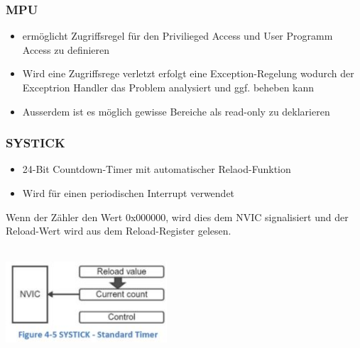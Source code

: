 \begin{multicols}{2}
\begin{minipage}{\linewidth}
        \subsubsection{MPU}
        \begin{itemize}
            \item ermöglicht Zugriffsregel für den Privilieged Access und User Programm Access zu definieren
            \item \rightarrow Wird eine Zugriffsrege verletzt erfolgt eine Exception-Regelung wodurch der Exceptrion Handler das Problem analysiert und ggf. beheben kann
            \item \rightarrow Ausserdem ist es möglich gewisse Bereiche als read-only zu deklarieren
        \end{itemize}
    \end{minipage}
\end{multicols}

\begin{multicols}{2}
    \begin{minipage}{\linewidth}
        \subsubsection{SYSTICK}
        \begin{itemize}
            \item 24-Bit Countdown-Timer mit automatischer Relaod-Funktion
            \item Wird für einen periodischen Interrupt verwendet
        \end{itemize}
        Wenn der Zähler den Wert 0x000000, wird dies dem NVIC signalisiert und  der Reload-Wert wird aus dem Reload-Register gelesen.
    \end{minipage}
    \\
    \newline
    \includegraphics[width=6cm]{images/NVIC}\\
\end{multicols}
\clearpage


